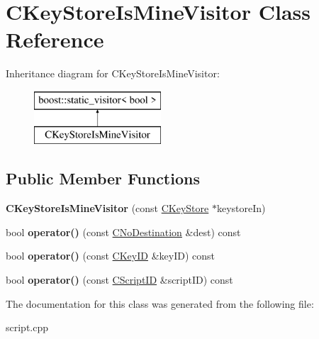 \hypertarget{class_c_key_store_is_mine_visitor}{}\section{C\+Key\+Store\+Is\+Mine\+Visitor Class Reference}
\label{class_c_key_store_is_mine_visitor}
Inheritance diagram for C\+Key\+Store\+Is\+Mine\+Visitor\+:\begin{figure}[H]
\begin{center}
\leavevmode
\includegraphics[height=2.000000cm]{class_c_key_store_is_mine_visitor}
\end{center}
\end{figure}
\subsection*{Public Member Functions}
\begin{DoxyCompactItemize}
\item 
\mbox{\label{class_c_key_store_is_mine_visitor_a477146504e2fe72cdae5b135e390583b}} 
{\bfseries C\+Key\+Store\+Is\+Mine\+Visitor} (const \mbox{\hyperlink{class_c_key_store}{C\+Key\+Store}} $\ast$keystore\+In)
\item 
\mbox{\label{class_c_key_store_is_mine_visitor_abd59e104924359f0f94a39381736ad98}} 
bool {\bfseries operator()} (const \mbox{\hyperlink{class_c_no_destination}{C\+No\+Destination}} \&dest) const
\item 
\mbox{\label{class_c_key_store_is_mine_visitor_ad6a4992926b0166404d9e0930c36ea14}} 
bool {\bfseries operator()} (const \mbox{\hyperlink{class_c_key_i_d}{C\+Key\+ID}} \&key\+ID) const
\item 
\mbox{\label{class_c_key_store_is_mine_visitor_ab2e7cc68fb08b4d6d6e52d6adb2390b3}} 
bool {\bfseries operator()} (const \mbox{\hyperlink{class_c_script_i_d}{C\+Script\+ID}} \&script\+ID) const
\end{DoxyCompactItemize}


The documentation for this class was generated from the following file\+:\begin{DoxyCompactItemize}
\item 
script.\+cpp\end{DoxyCompactItemize}
